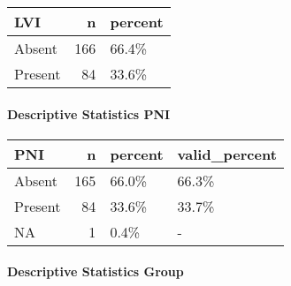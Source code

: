 \documentclass[
]{article}
\newenvironment{Shaded}{\begin{snugshade}}{\end{snugshade}}
\newcommand{\DataTypeTok}[1]{\textcolor[rgb]{0.00,0.34,0.68}{#1}}
\newcommand{\DecValTok}[1]{\textcolor[rgb]{0.69,0.50,0.00}{#1}}
\newcommand{\KeywordTok}[1]{\textcolor[rgb]{0.12,0.11,0.11}{\textbf{#1}}}
\newcommand{\NormalTok}[1]{\textcolor[rgb]{0.12,0.11,0.11}{#1}}
\newcommand{\OperatorTok}[1]{\textcolor[rgb]{0.12,0.11,0.11}{#1}}
\newcommand{\StringTok}[1]{\textcolor[rgb]{0.75,0.01,0.01}{#1}}
\begin{document}
\begin{longtable}[]{@{}lrl@{}}
\toprule
LVI & n & percent\tabularnewline
\midrule
\endhead
Absent & 166 & 66.4\%\tabularnewline
Present & 84 & 33.6\%\tabularnewline
\bottomrule
\end{longtable}

\pagebreak

\hypertarget{descriptive-statistics-pni}{%
\paragraph{Descriptive Statistics
PNI}\label{descriptive-statistics-pni}}

\begin{Shaded}
\end{Shaded}

\begin{longtable}[]{@{}lrll@{}}
\toprule
PNI & n & percent & valid\_percent\tabularnewline
\midrule
\endhead
Absent & 165 & 66.0\% & 66.3\%\tabularnewline
Present & 84 & 33.6\% & 33.7\%\tabularnewline
NA & 1 & 0.4\% & -\tabularnewline
\bottomrule
\end{longtable}

\pagebreak

\hypertarget{descriptive-statistics-group}{%
\paragraph{Descriptive Statistics
Group}\label{descriptive-statistics-group}}

\begin{Shaded}
\end{Shaded}
\end{document}
